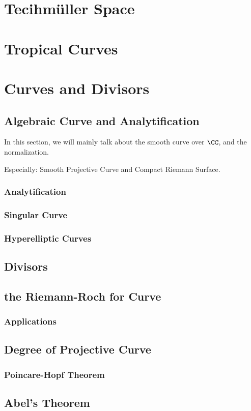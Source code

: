 \documentclass[Total.tex]{subfiles}
\begin{document}
	\chapter{Tecihmüller Space}
	\chapter{Tropical Curves}
	\chapter{Curves and Divisors}
	\section{Algebraic Curve and Analytification}
		In this section, we will mainly talk about the smooth curve over $\CC$, and the normalization. 
		
		Especially: Smooth Projective Curve and Compact Riemann Surface.
		
		\subsection{Analytification}
		\subsection{Singular Curve}
		\subsection{Hyperelliptic Curves}
	\section{Divisors}
	\section{the Riemann-Roch for Curve}
		\subsection{Applications}
	\section{Degree of Projective Curve}
		
		\subsection{Poincare-Hopf Theorem}
	\section{Abel's Theorem}
	
	
\end{document}
